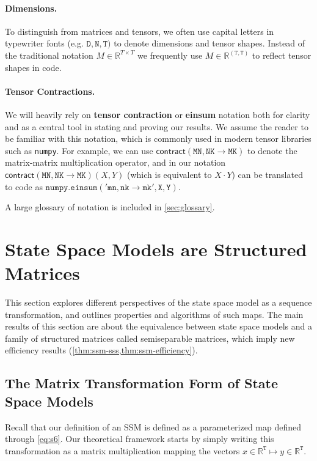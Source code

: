 \paragraph{Dimensions.}
To distinguish from matrices and tensors, we often use capital letters in typewriter fonts (e.g. $\mathtt{D}, \mathtt{N}, \mathtt{T})$ to denote dimensions and tensor shapes. Instead of the traditional notation $M \in \mathbb{R}^{T \times T}$ we frequently use $M \in \mathbb{R}^{\mathtt{(T,T)}}$ to reflect tensor shapes in code.

\paragraph{Tensor Contractions.}

We will heavily rely on \textbf{tensor contraction} or \textbf{einsum} notation both for clarity and as a central tool in stating and proving our results. We assume the reader to be familiar with this notation, which is commonly used in modern tensor libraries such as \texttt{numpy}.
For example, we can use $\mathsf{contract}(\mathtt{MN,NK \to MK})$ to denote the matrix-matrix multiplication operator, and in our notation $\mathsf{contract}(\mathtt{MN,NK \to MK})(X, Y)$ (which is equivalent to $X \cdot Y$) can be translated to code as $\mathtt{numpy.einsum('mn,nk\to mk', X, Y)}$.

A large glossary of notation is included in \ref{sec:glossary}.

\section{State Space Models are Structured Matrices}
\label{sec:ssm}

This section explores different perspectives of the state space model as a sequence transformation, and outlines properties and algorithms of such maps. The main results of this section are about the equivalence between state space models and a family of structured matrices called semiseparable matrices, which imply new efficiency results (\ref{thm:ssm-sss,thm:ssm-efficiency}).

\subsection{The Matrix Transformation Form of State Space Models}

Recall that our definition of an SSM is defined as a parameterized map defined through \eqref{eq:s6}.
Our theoretical framework starts by simply writing this transformation as a matrix multiplication mapping the vectors $x \in \mathbb{R}^\mathtt{T} \mapsto y \in \mathbb{R}^\mathtt{T}$.

